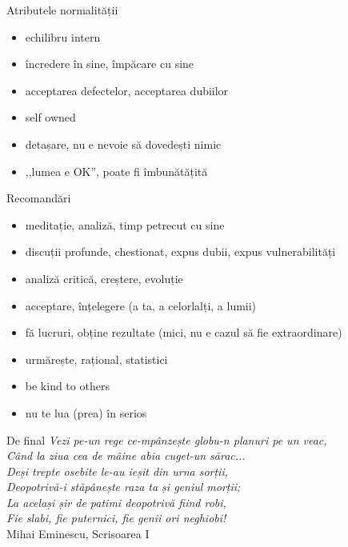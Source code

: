 \documentclass{simple}
\begin{document}
\begin{frame}{Atributele normalității}
  \begin{itemize}
    \pause
    \item echilibru intern
    \item încredere în sine, împăcare cu sine
    \item acceptarea defectelor, acceptarea dubiilor
    \item self owned
    \item detașare, nu e nevoie să dovedești nimic
    \item ,,lumea e OK'', poate fi îmbunătățită
  \end{itemize}
\end{frame}

\begin{frame}{Recomandări}
  \begin{itemize}
    \pause \item meditație, analiză, timp petrecut cu sine
    \pause \item discuții profunde, chestionat, expus dubii, expus vulnerabilități
    \pause \item analiză critică, creștere, evoluție
    \pause \item acceptare, înțelegere (a ta, a celorlalți, a lumii)
    \pause \item fă lucruri, obține rezultate (mici, nu e cazul să fie extraordinare)
    \pause \item urmărește, rațional, statistici
    \pause \item be kind to others
    \pause \item nu te lua (prea) în serios
  \end{itemize}
\end{frame}

\begin{frame}{De final}
  \textit{
Vezi pe-un rege ce-mpânzește globu-n planuri pe un veac,\\
Când la ziua cea de mâine abia cuget-un sărac...\\
Deși trepte osebite le-au ieșit din urna sorții,\\
Deopotrivă-i stăpânește raza ta și geniul morții;\\
La același șir de patimi deopotrivă fiind robi,\\
Fie slabi, fie puternici, fie genii ori neghiobi!\\
  }
  \vspace{3mm}
  \hfill Mihai Eminescu, Scrisoarea I
\end{frame}
\end{document}
